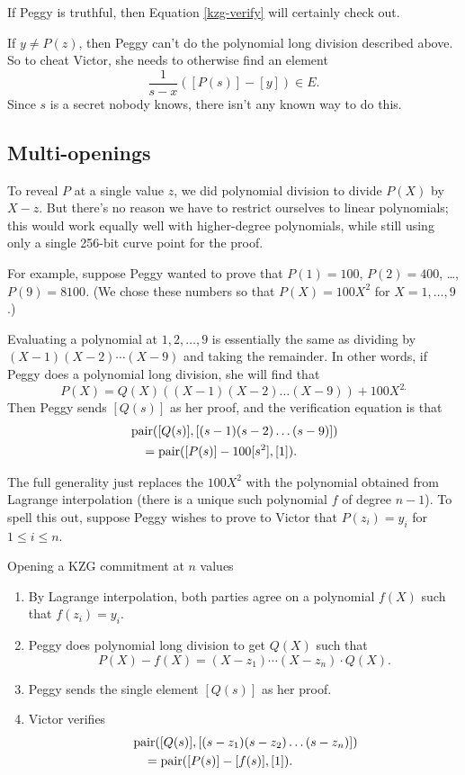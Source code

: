 If Peggy is truthful, then Equation \eqref{kzg-verify} will certainly check out.

If $y \neq P(z)$, then Peggy can't do the polynomial long division
described above. So to cheat Victor, she needs to otherwise find an
element
\[\frac{1}{s - x}( [ P(s) ] - [y] ) \in E.\]
Since $s$ is a secret nobody knows, there isn't any known way to do
this.

\subsection{Multi-openings}\label{multi-openings}

To reveal $P$ at a single value $z$, we did polynomial division to
divide $P(X)$ by $X - z$. But there's no reason we have to restrict
ourselves to linear polynomials; this would work equally well with
higher-degree polynomials, while still using only a single 256-bit curve
point for the proof.

For example, suppose Peggy wanted to prove that $P(1) = 100$,
$P(2) = 400$, \ldots, $P(9) = 8100$. (We chose these numbers so that
$P(X) = 100X^{2}$ for $X = 1,\ldots,9$.)

Evaluating a polynomial at $1,2,\ldots,9$ is essentially the same as
dividing by $(X - 1)(X - 2)\cdots(X - 9)$ and taking the remainder. In
other words, if Peggy does a polynomial long division, she will find
that
\[P(X) = Q(X)( (X - 1)(X - 2)\ldots(X - 9) ) + 100X^{2.}\]
Then Peggy sends $[Q(s)]$ as her proof, and
the verification equation is that
\begin{align*}
  &\operatorname{pair}( [Q(s)], [ (s - 1)(s - 2)\ldots(s - 9) ] ) \\
  &\quad = \operatorname{pair}( [P(s)] - 100[s^2], [1] ).
\end{align*}

The full generality just replaces the $100X^{2}$ with the polynomial
obtained from Lagrange interpolation
(there is a unique such polynomial $f$ of degree $n - 1$). To spell
this out, suppose Peggy wishes to prove to Victor that
$P( z_{i} ) = y_{i}$ for $1 \leq i \leq n$.

\begin{algo}{Opening a KZG commitment at $n$ values}{}
\begin{enumerate}
\item
  By Lagrange interpolation, both parties agree on a polynomial $f(X)$
  such that $f( z_{i} ) = y_{i}$.
\item
  Peggy does polynomial long division to get $Q(X)$ such that
  \[P(X) - f(X) = ( X - z_{1} )\cdots( X - z_{n} ) \cdot Q(X).\]
\item
  Peggy sends the single element $[ Q(s) ]$ as
  her proof.
\item
  Victor verifies
\begin{align*}
    &\operatorname{pair}([Q(s)], [ ( s - z_1 )( s - z_2 )\ldots( s - z_n ) ]) \\
    &\quad = \operatorname{pair}([P(s)] - [f(s)], [1]).
\end{align*}
\end{enumerate}
\end{algo}

